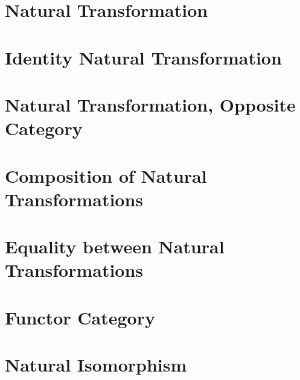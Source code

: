 \section{Natural Transformation}
    
\section{Identity Natural Transformation}
    
\section{Natural Transformation, Opposite Category}
    
\section{Composition of Natural Transformations}
    
\section{Equality between Natural Transformations}
    
\section{Functor Category}
    
\section{Natural Isomorphism}
    
